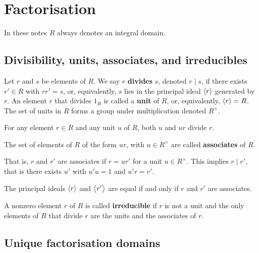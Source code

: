 \pagebreak

\section{Factorisation}

In these notes $ R $ always denotes an integral domain.

\subsection{Divisibility, units, associates, and irreducibles}

\begin{definition}
Let $ r $ and $ s $ be elements of $ R $. We say $ r $ \textbf{divides} $ s $, denoted $ r \mid s $, if there exists $ r' \in R $ with $ rr' = s $, or, equivalently, $ s $ lies in the principal ideal $ \left\langle r \right\rangle $ generated by $ r $. An element $ r $ that divides $ 1_R $ is called a \textbf{unit} of $ R $, or, equivalently, $ \left\langle r \right\rangle = R $. The set of units in $ R $ forms a group under multiplication denoted $ R^\times $.
\end{definition}

For any element $ r \in R $ and any unit $ u $ of $ R $, both $ u $ and $ ur $ divide $ r $.

\begin{definition}
The set of elements of $ R $ of the form $ ur $, with $ u \in R^\times $ are called \textbf{associates} of $ R $.
\end{definition}

That is, $ r $ and $ r' $ are associates if $ r = ur' $ for a unit $ u \in R^\times $. This implies $ r \mid r' $, that is there exists $ u' $ with $ u'u = 1 $ and $ u'r = r' $.

\begin{note*}
The principal ideals $ \left\langle r \right\rangle $ and $ \left\langle r' \right\rangle $ are equal if and only if $ r $ and $ r' $ are associates.
\end{note*}

\begin{definition}
A nonzero element $ r $ of $ R $ is called \textbf{irreducible} if $ r $ is not a unit and the only elements of $ R $ that divide $ r $ are the units and the associates of $ r $.
\end{definition}

\subsection{Unique factorisation domains}

